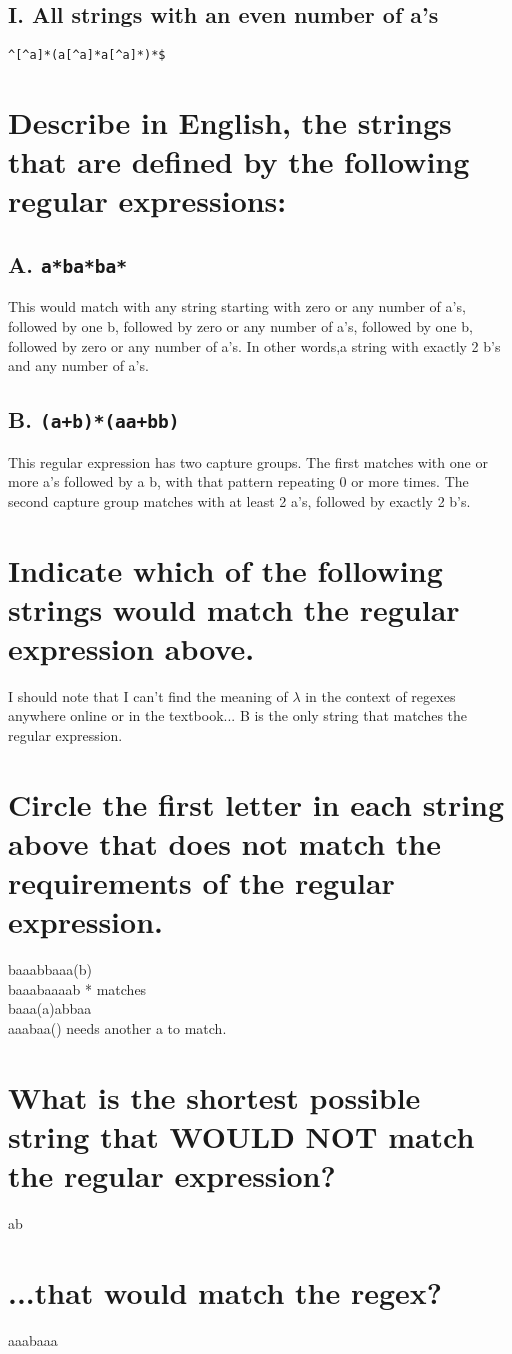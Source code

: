 \documentclass[12pt,titlepage]{article}
\begin{document}
\subsection*{I. All strings with an even number of a's}
\verb!^[^a]*(a[^a]*a[^a]*)*$!
\section{Describe in English, the strings that are defined by the following regular expressions:}
\subsection*{A. \texttt{a*ba*ba*}}
This would match with any string starting with zero or any number of a's, followed by one b,
followed by zero or any number of a's, followed by one b, followed by zero or any number of a's.
In other words,a string with exactly 2 b's and any number of a's.
\subsection*{B. \texttt{(a+b)*(aa+bb)}}
This regular expression has two capture groups. The first matches with one or more a's followed by a b, with that pattern repeating 0 or more times. The second capture group matches with at least 2 a's, followed by exactly 2 b's.
\section{Indicate which of the following strings would match the regular expression above.}
I should note that I can't find the meaning of $\lambda$ in the context of regexes anywhere online or in the textbook...
B is the only string that matches the regular expression.
\section{Circle the first letter in each string above that does not match the requirements of the
regular expression.}
baaabbaaa(b)\\
baaabaaaab * matches\\
baaa(a)abbaa\\
aaabaa() needs another a to match.\\
\section{What is the shortest possible string that WOULD NOT match the regular expression?}
ab
\section{...that would match the regex?}
aaabaaa
\end{document}
